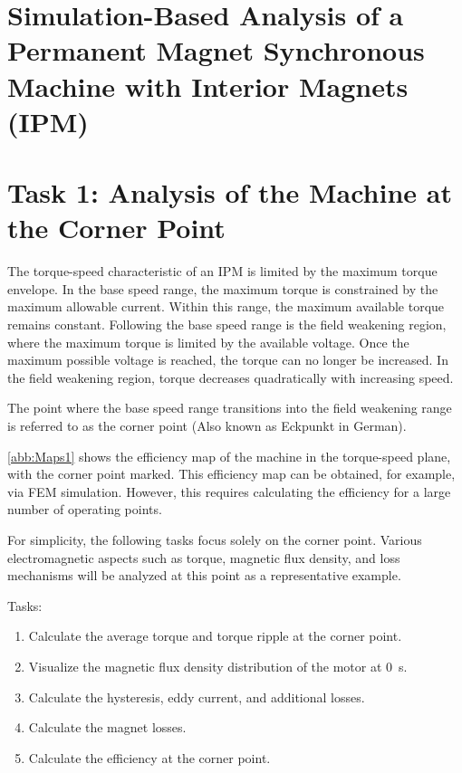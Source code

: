 %
%

\chapter*{Simulation-Based Analysis of a Permanent Magnet Synchronous Machine with Interior Magnets (IPM)}
\chapter{Task 1: Analysis of the Machine at the Corner Point}

The torque-speed characteristic of an \gls{IPM} is limited by the maximum torque envelope. In the base speed range, the maximum torque is constrained by the maximum allowable current. Within this range, the maximum available torque remains constant. Following the base speed range is the field weakening region, where the maximum torque is limited by the available voltage. Once the maximum possible voltage is reached, the torque can no longer be increased. In the field weakening region, torque decreases quadratically with increasing speed. 

The point where the base speed range transitions into the field weakening range is referred to as the corner point (Also known as Eckpunkt in German). 

\autoref{abb:Maps1} shows the efficiency map of the machine in the torque-speed plane, with the corner point marked. This efficiency map can be obtained, for example, via \gls{FEM} simulation. However, this requires calculating the efficiency for a large number of operating points. 

For simplicity, the following tasks focus solely on the corner point. Various electromagnetic aspects such as torque, magnetic flux density, and loss mechanisms will be analyzed at this point as a representative example.

\bigskip

Tasks:
\begin{enumerate}
	\item Calculate the average torque and torque ripple at the corner point.
	\item Visualize the magnetic flux density distribution of the motor at \SI{0}{\second}.
	\item Calculate the hysteresis, eddy current, and additional losses.
	\item Calculate the magnet losses.
	\item Calculate the efficiency at the corner point.
\end{enumerate}

